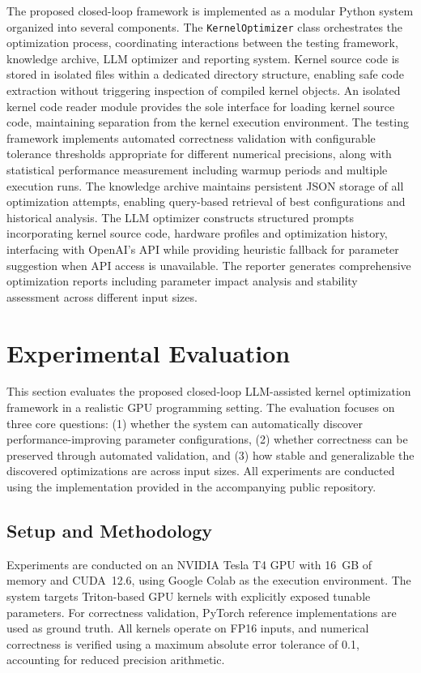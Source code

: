 \documentclass{article}
\begin{document}
The proposed closed-loop framework is implemented as a modular Python system organized into several components. The \texttt{KernelOptimizer} class orchestrates the optimization process, coordinating interactions between the testing framework, knowledge archive, LLM optimizer and reporting system. Kernel source code is stored in isolated files within a dedicated directory structure, enabling safe code extraction without triggering inspection of compiled kernel objects. An isolated kernel code reader module provides the sole interface for loading kernel source code, maintaining separation from the kernel execution environment. The testing framework implements automated correctness validation with configurable tolerance thresholds appropriate for different numerical precisions, along with statistical performance measurement including warmup periods and multiple execution runs. The knowledge archive maintains persistent JSON storage of all optimization attempts, enabling query-based retrieval of best configurations and historical analysis. The LLM optimizer constructs structured prompts incorporating kernel source code, hardware profiles and optimization history, interfacing with OpenAI's API while providing heuristic fallback for parameter suggestion when API access is unavailable. The reporter generates comprehensive optimization reports including parameter impact analysis and stability assessment across different input sizes.

\section{Experimental Evaluation}

This section evaluates the proposed closed-loop LLM-assisted kernel optimization framework in a realistic GPU programming setting. The evaluation focuses on three core questions: (1) whether the system can automatically discover performance-improving parameter configurations, (2) whether correctness can be preserved through automated validation, and (3) how stable and generalizable the discovered optimizations are across input sizes. All experiments are conducted using the implementation provided in the accompanying public repository.

\subsection{Setup and Methodology}

Experiments are conducted on an NVIDIA Tesla T4 GPU with 16~GB of memory and CUDA~12.6, using Google Colab as the execution environment. The system targets Triton-based GPU kernels with explicitly exposed tunable parameters. For correctness validation, PyTorch reference implementations are used as ground truth. All kernels operate on FP16 inputs, and numerical correctness is verified using a maximum absolute error tolerance of 0.1, accounting for reduced precision arithmetic.
\end{document}
